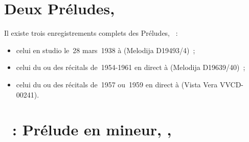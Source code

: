 \section*{%
Deux Préludes, }

Il existe trois enregistrements complets des Préludes, ~:
\begin{itemize}
 \item
 celui en studio le~28 mars~1938 à \Leningrad (Melodija D19493/4)~;
 \item
 celui du ou des récitals de~1954-1961 en direct à \MSHM (Melodija
 D19639/40)~;
 \item
 celui du ou des récitals de~1957 ou~1959 en direct à \MSHM (Vista Vera
 VVCD-00241).
\end{itemize}

\section{\ifChrono \Scriabine{}~: \fi
Prélude en \kG mineur,  , }
\label{\thesection}

